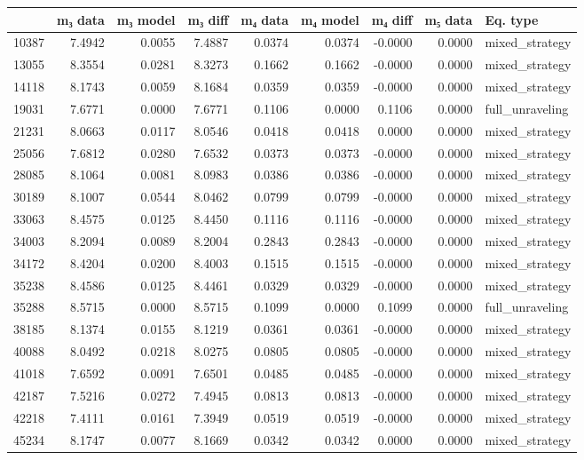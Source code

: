 \begin{tabular}{lrrrrrrrl}
\toprule
 & m₃ data & m₃ model & m₃ diff & m₄ data & m₄ model & m₄ diff & m₅ data & Eq. type \\
\midrule
10387 & 7.4942 & 0.0055 & 7.4887 & 0.0374 & 0.0374 & -0.0000 & 0.0000 & mixed_strategy \\
13055 & 8.3554 & 0.0281 & 8.3273 & 0.1662 & 0.1662 & -0.0000 & 0.0000 & mixed_strategy \\
14118 & 8.1743 & 0.0059 & 8.1684 & 0.0359 & 0.0359 & -0.0000 & 0.0000 & mixed_strategy \\
19031 & 7.6771 & 0.0000 & 7.6771 & 0.1106 & 0.0000 & 0.1106 & 0.0000 & full_unraveling \\
21231 & 8.0663 & 0.0117 & 8.0546 & 0.0418 & 0.0418 & 0.0000 & 0.0000 & mixed_strategy \\
25056 & 7.6812 & 0.0280 & 7.6532 & 0.0373 & 0.0373 & -0.0000 & 0.0000 & mixed_strategy \\
28085 & 8.1064 & 0.0081 & 8.0983 & 0.0386 & 0.0386 & -0.0000 & 0.0000 & mixed_strategy \\
30189 & 8.1007 & 0.0544 & 8.0462 & 0.0799 & 0.0799 & -0.0000 & 0.0000 & mixed_strategy \\
33063 & 8.4575 & 0.0125 & 8.4450 & 0.1116 & 0.1116 & -0.0000 & 0.0000 & mixed_strategy \\
34003 & 8.2094 & 0.0089 & 8.2004 & 0.2843 & 0.2843 & -0.0000 & 0.0000 & mixed_strategy \\
34172 & 8.4204 & 0.0200 & 8.4003 & 0.1515 & 0.1515 & -0.0000 & 0.0000 & mixed_strategy \\
35238 & 8.4586 & 0.0125 & 8.4461 & 0.0329 & 0.0329 & -0.0000 & 0.0000 & mixed_strategy \\
35288 & 8.5715 & 0.0000 & 8.5715 & 0.1099 & 0.0000 & 0.1099 & 0.0000 & full_unraveling \\
38185 & 8.1374 & 0.0155 & 8.1219 & 0.0361 & 0.0361 & -0.0000 & 0.0000 & mixed_strategy \\
40088 & 8.0492 & 0.0218 & 8.0275 & 0.0805 & 0.0805 & -0.0000 & 0.0000 & mixed_strategy \\
41018 & 7.6592 & 0.0091 & 7.6501 & 0.0485 & 0.0485 & -0.0000 & 0.0000 & mixed_strategy \\
42187 & 7.5216 & 0.0272 & 7.4945 & 0.0813 & 0.0813 & -0.0000 & 0.0000 & mixed_strategy \\
42218 & 7.4111 & 0.0161 & 7.3949 & 0.0519 & 0.0519 & -0.0000 & 0.0000 & mixed_strategy \\
45234 & 8.1747 & 0.0077 & 8.1669 & 0.0342 & 0.0342 & 0.0000 & 0.0000 & mixed_strategy \\

\end{tabular}
